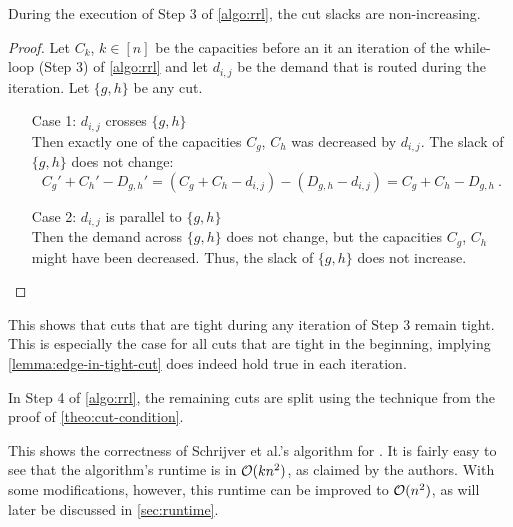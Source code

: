 \begin{lemma}
	\label{lemma:tight-cuts-remain-tight}
	During the execution of Step 3 of \cref{algo:rrl}, the cut slacks are non-increasing.
\end{lemma}
\begin{proof}
	Let $C_k$, $k \in [n]$ be the capacities before an it an iteration of the while-loop (Step 3) of \cref{algo:rrl} and let $d_{i, j}$ be the demand that is routed during the iteration.
	Let $\{g, h\}$ be any cut.
	
	\begin{enumerate}[align=left]
		\item[Case 1: $d_{i, j}$ crosses $\{g, h\}$]{\mbox{}\\
			Then exactly one of the capacities $C_g$, $C_h$ was decreased by $d_{i, j}$.
			The slack of $\{g, h\}$ does not change:
			\begin{equation}
				C_g' + C_h' - D_{g, h}' = (C_g + C_h - d_{i, j}) - (D_{g, h} - d_{i, j}) = C_g + C_h - D_{g, h} \ .
			\end{equation}
		}
		\item[Case 2: $d_{i, j}$ is parallel to $\{g, h\}$]{\mbox{}\\
			Then the demand across $\{g, h\}$ does not change, but the capacities $C_g$, $C_h$ might have been decreased.
			Thus, the slack of $\{g, h\}$ does not increase.
		}
	\end{enumerate}
\end{proof}

This shows that cuts that are tight during any iteration of Step 3 remain tight.
This is especially the case for all cuts that are tight in the beginning, implying \cref{lemma:edge-in-tight-cut} does indeed hold true in each iteration.

In Step 4 of \cref{algo:rrl}, the remaining cuts are split using the technique from the proof of \cref{theo:cut-condition}.

This shows the correctness of Schrijver et al.'s \cite{schrijver99} algorithm for \RRL.
It is fairly easy to see that the algorithm's runtime is in $\mathcal{O}(k n^2)$, as claimed by the authors.
With some modifications, however, this runtime can be improved to $\mathcal{O}(n^2)$, as will later be discussed in \cref{sec:runtime}.

